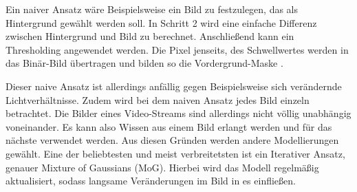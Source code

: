 Ein naiver Ansatz wäre Beispielsweise ein Bild zu festzulegen, das als Hintergrund gewählt werden soll. In Schritt 2 wird eine einfache Differenz zwischen Hintergrund und Bild zu berechnet. Anschließend kann ein Thresholding angewendet werden. Die Pixel jenseits, des Schwellwertes werden in das Binär-Bild übertragen und bilden so die Vordergrund-Maske \autocite[3]{foreground2003}. 

Dieser naive Ansatz ist allerdings anfällig gegen Beispielsweise sich verändernde Lichtverhältnisse. Zudem wird bei dem naiven Ansatz jedes Bild einzeln betrachtet. Die Bilder eines Video-Streams sind allerdings nicht völlig unabhängig voneinander. Es kann also Wissen aus einem Bild erlangt werden und für das nächste verwendet werden.  Aus diesen Gründen werden andere Modellierungen gewählt. Eine der beliebtesten und meist verbreitetsten ist ein Iterativer Ansatz, genauer Mixture of Gaussians (MoG). Hierbei wird das Modell regelmäßig aktualisiert, sodass langsame Veränderungen im Bild in es einfließen. \autocite[4]{foreground2003}

